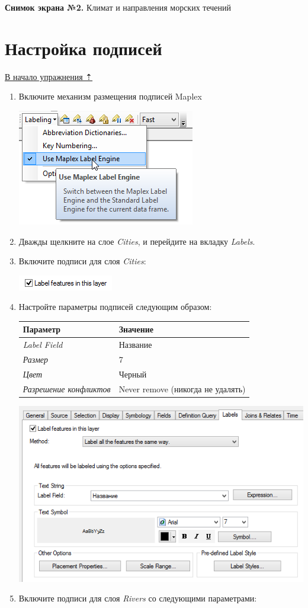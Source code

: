 \documentclass[]{book}
\theoremstyle{definition}
\theoremstyle{definition}
\theoremstyle{definition}
\theoremstyle{remark}
\begin{document}
\textbf{Снимок экрана №2.} Климат и направления морских течений

\hypertarget{map-design-climates-labels}{%
\section{Настройка подписей}\label{map-design-climates-labels}}

\protect\hyperlink{map-design-climates}{В начало упражнения ⇡}

\begin{enumerate}
\def\labelenumi{\arabic{enumi}.}
\item
  Включите механизм размещения подписей Maplex

  \includegraphics{images/Ex03/image26.png}
\item
  Дважды щелкните на слое \emph{Cities}, и перейдите на вкладку
  \emph{Labels}.
\item
  Включите подписи для слоя \emph{Cities}:

  \includegraphics{images/Ex03/image27.png}
\item
  Настройте параметры подписей следующим образом:

  \begin{longtable}[]{@{}ll@{}}
  \toprule
  \textbf{Параметр} & \textbf{Значение}\tabularnewline
  \midrule
  \endhead
  \emph{Label Field} & Название\tabularnewline
  \emph{Размер} & 7\tabularnewline
  \emph{Цвет} & Черный\tabularnewline
  \emph{Разрешение конфликтов} & Never remove (никогда не
  удалять)\tabularnewline
  \bottomrule
  \end{longtable}

  \includegraphics{images/Ex03/image28.png}
\item
  Включите подписи для слоя \emph{Rivers} со следующими параметрами:


\end{enumerate}
\end{document}
